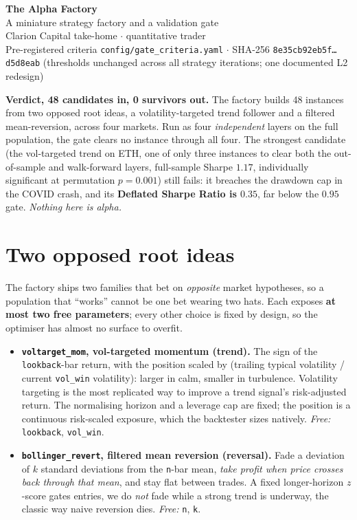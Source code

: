 \documentclass[11pt]{article}
\newcommand{\code}[1]{\texttt{\small #1}}
\begin{document}
\begin{center}
 {\LARGE\bfseries The Alpha Factory}\\[2pt]
 {\large A miniature strategy factory and a validation gate}\\[4pt]
 {\normalsize Clarion Capital take-home $\cdot$ quantitative trader}\\[2pt]
 {\footnotesize Pre-registered criteria \code{config/gate\_criteria.yaml} $\cdot$
  SHA-256 \code{8e35cb92eb5f\ldots d5d8eab} (thresholds unchanged across all strategy iterations; one documented L2 redesign)}
\end{center}

\begin{tcolorbox}[colback=kill!5,colframe=kill!70,boxrule=0.6pt,arc=2pt,
 left=6pt,right=6pt,top=4pt,bottom=4pt]
\textbf{Verdict, 48 candidates in, 0 survivors out.}
The factory builds 48 instances from two opposed root ideas, a volatility-targeted
trend follower and a filtered mean-reversion, across four markets. Run as four
\emph{independent} layers on the full population, the gate clears no instance through
all four. The strongest candidate (the vol-targeted trend on ETH, one of only
three instances to clear both the out-of-sample and walk-forward layers, full-sample
Sharpe $1.17$, individually significant at permutation $p=0.001$) still fails: it
breaches the drawdown cap in the COVID crash, and its \textbf{Deflated Sharpe Ratio
is $0.35$}, far below the $0.95$ gate. \emph{Nothing here is alpha.}
\end{tcolorbox}

\section{Two opposed root ideas}
The factory ships two families that bet on \emph{opposite} market hypotheses, so a
population that ``works'' cannot be one bet wearing two hats. Each exposes
\textbf{at most two free parameters}; every other choice is fixed by design, so the
optimiser has almost no surface to overfit.

\begin{itemize}
\item \textbf{\code{voltarget\_mom}, vol-targeted momentum (trend).} The
sign of the \code{lookback}-bar return, with the position scaled by (trailing
typical volatility / current \code{vol\_win} volatility): larger in calm, smaller in
turbulence. Volatility targeting is the most replicated way to improve a trend
signal's risk-adjusted return. The normalising horizon and a leverage cap are fixed;
the position is a continuous risk-scaled exposure, which the backtester sizes
natively. \emph{Free:} \code{lookback}, \code{vol\_win}.
\item \textbf{\code{bollinger\_revert}, filtered mean reversion (reversal).} Fade
a deviation of $k$ standard deviations from the \code{n}-bar mean, \emph{take profit
when price crosses back through that mean}, and stay flat between trades. A fixed
longer-horizon $z$-score gates entries, we do \emph{not} fade while a strong trend
is underway, the classic way naive reversion dies. \emph{Free:} \code{n}, \code{k}.
\end{itemize}
\end{document}
